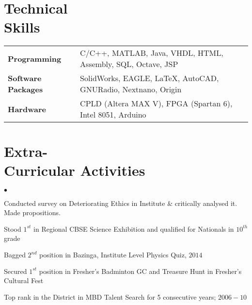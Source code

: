 \documentclass[margin,line]{res}
\newenvironment{list2}{
  \begin{list}{$\bullet$}{%
      \setlength{\itemsep}{0in}
      \setlength{\parsep}{0in} \setlength{\parskip}{0in}
      \setlength{\topsep}{0in} \setlength{\partopsep}{0in} 
      \setlength{\leftmargin}{0.2in}}}{\end{list}}
\begin{document}
\begin{resume}
\section{\sc Technical \\Skills} 
\begin{tabular}{@{}p{1.3in}p{4.3in}}
\textbf{Programming} & C/C++, MATLAB, Java, VHDL, HTML, Assembly, SQL, Octave, JSP \\  
\vspace*{-0.06in}
\textbf{Software Packages} & 
\vspace*{-0.06in}
SolidWorks, EAGLE, \LaTeX, AutoCAD, GNURadio, Nextnano, Origin\\ 
\vspace*{-0.06in}
\textbf{Hardware} &
\vspace*{-0.06in}
CPLD (Altera MAX V), FPGA (Spartan 6), Intel 8051, Arduino\\     
\end{tabular}

\section{\sc Extra-\\Curricular Activities} 
\begin{list2}
\item Conducted survey on Deteriorating Ethics in Institute \& critically analysed it. Made propositions.
\item Stood $1^{st}$ in Regional CBSE Science Exhibition and qualified for Nationals in $10^{th}$ grade
\item Bagged $2^{nd}$ position in Bazinga, Institute Level Physics Quiz, $2014$
\item Secured $1^{st}$ position in Fresher's Badminton GC and Treasure Hunt in Fresher's Cultural Fest
\item Top rank in the District in MBD Talent Search for 5 consecutive years; $2006-10$
\end{list2}


\end{resume}
\end{document}
